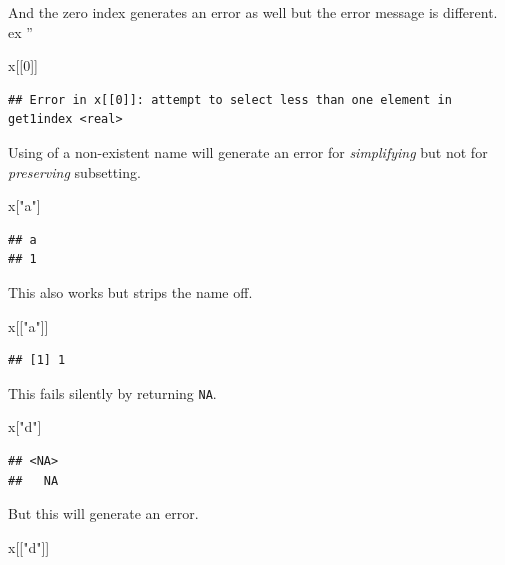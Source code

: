 \documentclass[
]{book}
\newenvironment{Shaded}{\begin{snugshade}}{\end{snugshade}}
\newcommand{\DecValTok}[1]{\textcolor[rgb]{0.00,0.00,0.81}{#1}}
\newcommand{\NormalTok}[1]{#1}
\newcommand{\StringTok}[1]{\textcolor[rgb]{0.31,0.60,0.02}{#1}}
\begin{document}
And the zero index generates an error as well but the error message is different.
ex ''

\begin{Shaded}
\begin{Highlighting}[]
\NormalTok{x[[}\DecValTok{0}\NormalTok{]]}
\end{Highlighting}
\end{Shaded}

\begin{verbatim}
## Error in x[[0]]: attempt to select less than one element in get1index <real>
\end{verbatim}

Using of a non-existent name will generate an error for \emph{simplifying} but not for \emph{preserving} subsetting.

\begin{Shaded}
\begin{Highlighting}[]
\NormalTok{x[}\StringTok{"a"}\NormalTok{]}
\end{Highlighting}
\end{Shaded}

\begin{verbatim}
## a 
## 1
\end{verbatim}

This also works but strips the name off.

\begin{Shaded}
\begin{Highlighting}[]
\NormalTok{x[[}\StringTok{"a"}\NormalTok{]]}
\end{Highlighting}
\end{Shaded}

\begin{verbatim}
## [1] 1
\end{verbatim}

This fails silently by returning \texttt{NA}.

\begin{Shaded}
\begin{Highlighting}[]
\NormalTok{x[}\StringTok{"d"}\NormalTok{]}
\end{Highlighting}
\end{Shaded}

\begin{verbatim}
## <NA> 
##   NA
\end{verbatim}

But this will generate an error.

\begin{Shaded}
\begin{Highlighting}[]
\NormalTok{x[[}\StringTok{"d"}\NormalTok{]]}
\end{Highlighting}
\end{Shaded}
\end{document}
